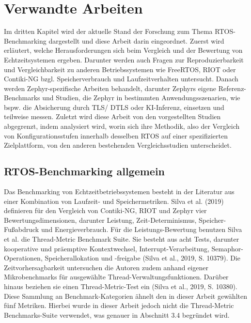 \chapter{Verwandte Arbeiten}
\label{ch:verwandte-arbeiten}

Im dritten Kapitel wird der aktuelle Stand der Forschung zum Thema RTOS-Benchmarking dargestellt und diese Arbeit darin eingeordnet. Zuerst wird erl{\"a}utert, welche Herausforderungen sich beim Vergleich und der Bewertung von Echtzeitsystemen ergeben. Darunter werden auch Fragen zur Reproduzierbarkeit und Vergleichbarkeit zu anderen Betriebssystemen wie FreeRTOS, RIOT oder Contiki-NG bzgl. Speicherverbrauch und Laufzeitverhalten untersucht. Danach werden Zephyr-spezifische Arbeiten behandelt, darunter Zephyrs eigene Referenz-Benchmarks und Studien, die Zephyr in bestimmten Anwendungsszenarien, wie bspw. die Absicherung durch TLS/ DTLS oder KI-Inferenz, einsetzen und teilweise messen. Zuletzt wird diese Arbeit von den vorgestellten Studien abgegrenzt, indem analysiert wird, worin sich ihre Methodik, also der Vergleich von Konfigurationsstufen innerhalb desselben RTOS auf einer spezifizierten Zielplattform, von den anderen bestehenden Vergleichsstudien unterscheidet.

\section{RTOS-Benchmarking allgemein}
Das Benchmarking von Echtzeitbetriebssystemen besteht in der Literatur aus einer Kombination von Laufzeit- und Speichermetriken. Silva et al. (2019) definieren f{\"u}r den Vergleich von Contiki-NG, RIOT und Zephyr vier Bewertungsdimensionen, darunter Leistung, Zeit-Determinismus, Speicher-Fu{\ss}abdruck und Energieverbrauch. F{\"u}r die Leistungs-Bewertung benutzen Silva et al. die Thread-Metric Benchmark Suite. Sie besteht aus acht Tests, darunter kooperative und pr{\"a}emptive Kontextwechsel, Interrupt-Verarbeitung, Semaphor-Operationen, Speicherallokation und -freigabe (Silva et al., 2019, S. 10379). Die Zeitvorhersagbarkeit untersuchen die Autoren zudem anhand eigener Mikrobenchmarks f{\"u}r ausgew{\"a}hlte Thread-Verwaltungsfunktionen. Dar{\"u}ber hinaus beziehen sie einen Thread-Metric-Test ein (Silva et al., 2019, S. 10380). Diese Sammlung an Benchmark-Kategorien {\"a}hnelt den in dieser Arbeit gew{\"a}hlten f{\"u}nf Metriken. Hierbei wurde in dieser Arbeit jedoch nicht die Thread-Metric Benchmarks-Suite verwendet, was genauer in Abschnitt 3.4 begr{\"u}ndet wird.

